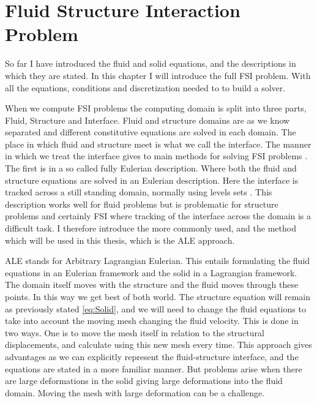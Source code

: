 \chapter{Fluid Structure Interaction Problem}
So far I have introduced the fluid and solid equations, and the descriptions in which they are stated. In this chapter I will introduce the full FSI problem. With all the equations, conditions and discretization needed to to build a solver. \newline

When we compute FSI problems the computing domain is split into three parts, Fluid, Structure and Interface. Fluid and structure domains are as we know separated and different constitutive equations are solved in each domain. The place in which fluid and structure meet is what we call the interface. The manner in which we treat the interface gives to main methods for solving FSI problems \cite{Liu2014}. The first is in a so called fully Eulerian description. Where both the fluid and structure equations are solved in an Eulerian description. Here the interface is tracked across a still standing domain, normally using levels sets \cite{Valkov2015}. This description works well for fluid problems but is problematic for structure problems and certainly FSI where tracking of the interface across the domain is a difficult task. I therefore introduce the more commonly used, and the method which will be used in this thesis, which is the ALE approach. \newline

ALE stands for Arbitrary Lagrangian Eulerian. This entails formulating the fluid equations in an Eulerian framework and the solid in a Lagrangian framework. The domain itself moves with the structure  and the fluid moves through these points. In this way we get best of both world. The structure equation will remain as previously stated \eqref{eq:Solid}, and we will need to change the fluid equations to take into account the moving mesh changing the fluid velocity. This is done in two ways. One is to move the mesh itself in relation to the structural displacements, and calculate using this new mesh every time.
This approach gives advantages as we can explicitly represent the fluid-structure interface, and the equations are stated in a more familiar manner. But problems arise when there are large deformations in the solid giving large deformations into the fluid domain. Moving the mesh with large deformation can be a challenge. \newline

